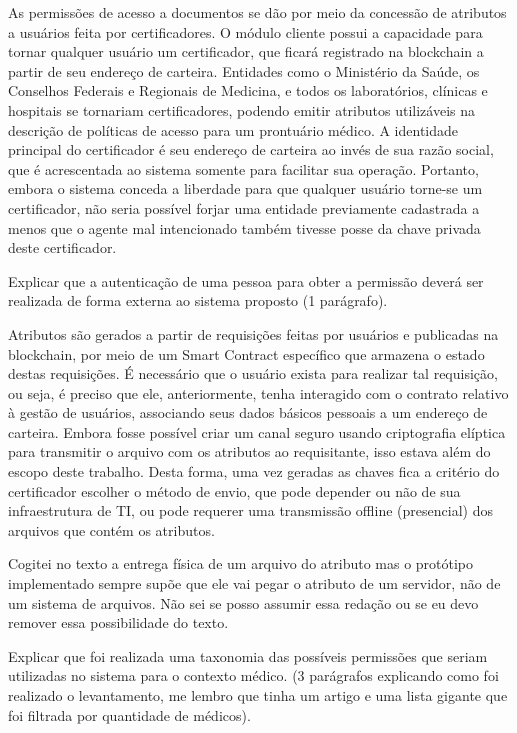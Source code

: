 \documentclass[a4paper,11pt]{article}
\begin{document}
As permissões de acesso a documentos se dão por meio da concessão de atributos a usuários feita por certificadores. O módulo cliente possui a capacidade para tornar qualquer usuário um certificador, que ficará registrado na blockchain a partir de seu endereço de carteira. Entidades como o Ministério da Saúde, os Conselhos Federais e Regionais de Medicina, e todos os laboratórios, clínicas e hospitais se tornariam certificadores, podendo emitir atributos utilizáveis na descrição de políticas de acesso para um prontuário médico. A identidade principal do certificador é seu endereço de carteira ao invés de sua razão social, que é acrescentada ao sistema somente para facilitar sua operação. Portanto, embora o sistema conceda a liberdade para que qualquer usuário torne-se um certificador, não seria possível forjar uma entidade previamente cadastrada a menos que o agente mal intencionado também tivesse posse da chave privada deste certificador.

{\color{ForestGreen}Explicar que a autenticação de uma pessoa para obter a permissão deverá ser realizada de forma externa ao sistema proposto (1 parágrafo).}

Atributos são gerados a partir de requisições feitas por usuários e publicadas na blockchain, por meio de um Smart Contract específico que armazena o estado destas requisições. É necessário que o usuário exista para realizar tal requisição, ou seja, é preciso que ele, anteriormente, tenha interagido com o contrato relativo à gestão de usuários, associando seus dados básicos pessoais a um endereço de carteira. Embora fosse possível criar um canal seguro usando criptografia elíptica para transmitir o arquivo com os atributos ao requisitante, isso estava além do escopo deste trabalho. Desta forma, uma vez geradas as chaves fica a critério do certificador escolher o método de envio, que pode depender ou não de sua infraestrutura de TI, ou pode requerer uma transmissão offline (presencial) dos arquivos que contém os atributos.

{\color{RoyalBlue} Cogitei no texto a entrega física de um arquivo do atributo mas o protótipo implementado sempre supõe que ele vai pegar o atributo de um servidor, não de um sistema de arquivos. Não sei se posso assumir essa redação ou se eu devo remover essa possibilidade do texto.}

{\color{ForestGreen}Explicar que foi realizada uma taxonomia das possíveis permissões que seriam utilizadas no sistema para o contexto médico. (3 parágrafos explicando como foi realizado o levantamento, me lembro que tinha um artigo e uma lista gigante que foi filtrada por quantidade de médicos).}
\end{document}

